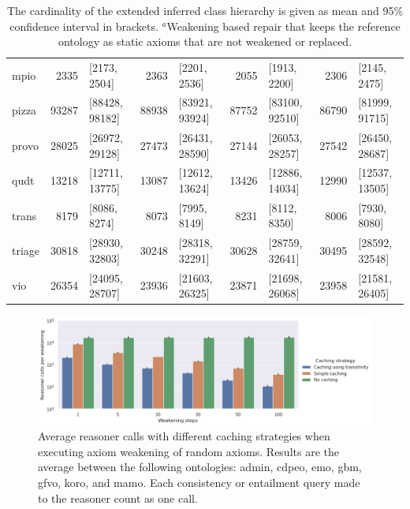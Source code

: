 \begin{table}[ht]
\begin{tabular}{|l|r@{ }lr@{ }lr@{ }lr@{ }l|}
    mpio & 2335 & [2173, 2504] & 2363 & [2201, 2536] & 2055 & [1913, 2200] & 2306 & [2145, 2475] \\
    pizza & 93287 & [88428, 98182] & 88938 & [83921, 93924] & 87752 & [83100, 92510] & 86790 & [81999, 91715] \\
    provo & 28025 & [26972, 29128] & 27473 & [26431, 28590] & 27144 & [26053, 28257] & 27542 & [26450, 28687] \\
    qudt & 13218 & [12711, 13775] & 13087 & [12612, 13624] & 13426 & [12886, 14034] & 12990 & [12537, 13505] \\
    trans & 8179 & [8086, 8274] & 8073 & [7995, 8149] & 8231 & [8112, 8350] & 8006 & [7930, 8080] \\
    triage & 30818 & [28930, 32803] & 30248 & [28318, 32291] & 30628 & [28759, 32641] & 30495 & [28592, 32548] \\
    vio & 26354 & [24095, 28707] & 23936 & [21603, 26325] & 23871 & [21698, 26068] & 23958 & [21581, 26405] \\
    \hline
  \end{tabular}
  \caption{The cardinality of the extended inferred class hierarchy is given as mean and 95\% confidence interval in brackets. $^a$Weakening based repair that keeps the reference ontology as static axioms that are not weakened or replaced.}
\end{table}

\begin{figure}[ht]
    \centering
    \includegraphics[width=\textwidth]{resources/calls-cache-bar.png}
    \caption{Average reasoner calls with different caching strategies when executing axiom weakening of random axioms. Results are the average between the following ontologies: admin, cdpeo, emo, gbm, gfvo, koro, and mamo. Each consistency or entailment query made to the reasoner count as one call.}
\end{figure}

